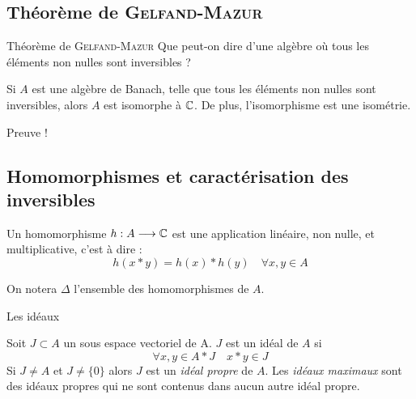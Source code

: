 \documentclass[11pt, xcolor=table]{beamer}
\begin{document}
\subsection{Théorème de \textsc{Gelfand}-\textsc{Mazur}}

\begin{frame}{Théorème de \textsc{Gelfand}-\textsc{Mazur}}
    Que peut-on dire d'une algèbre où tous les éléments non nulles sont inversibles ?

    \begin{myth}
        Si $A$ est une algèbre de Banach, telle que tous les éléments non nulles sont inversibles, alors $A$ est isomorphe à
        $\mathbb{C}$. De plus, l'isomorphisme est une isométrie.  
    \end{myth}
    \pause 
    Preuve !
\end{frame}

\subsection{Homomorphismes et caractérisation des inversibles}

\begin{frame}
    \begin{mydef}[Homomorphisme]
        Un homomorphisme $h : A \longrightarrow \mathbb{C}$ est une application linéaire, non nulle, et multiplicative, c'est à dire :
        \[
            h(x*y) = h(x)*h(y) \quad \forall x,y \in A
        \]
    \end{mydef}

    \begin{mydef}
        On notera $\Delta$ l'ensemble des homomorphismes de $A$.
    \end{mydef} 
\end{frame}

\begin{frame}{Les idéaux}
    \begin{mydef}[Idéal]
        Soit $J \subset A$ un sous espace vectoriel de A. $J$ est un idéal de $A$ si 
        \[
            \forall x, y \in A*J \quad x*y \in J
        \] 
        Si $J \not = A$ et $J \not = \{0\}$ alors $J$ est un \emph{idéal propre} de $A$. Les \emph{idéaux maximaux} sont des idéaux propres qui ne sont
        contenus dans aucun autre idéal propre.
    \end{mydef}
\end{frame}
\end{document}
